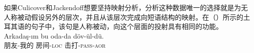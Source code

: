 \begin{exe}
\begin{xlist}[iv.]
\begin{exe}
\begin{xlist}[iv.]

如果Culicover和Jackendoff想要坚持映射分析，分析这种数据唯一的选择就是为无人称被动假设另外的层次，并且从该层次完成向短语结构的映射。在（）所示的土耳其语的句子中，该句是人称被动，向这个层面的投射具有相同的功能。
\ea
\gll Arkadaş-ım bu oda-da döv-ül-dü.\\
     朋友-我的     房间-\textsc{loc} 击打-\textsc{pass}-\textsc{aor}\\
%
\z


\end{xlist}
\end{exe}
\end{xlist}
\end{exe}
